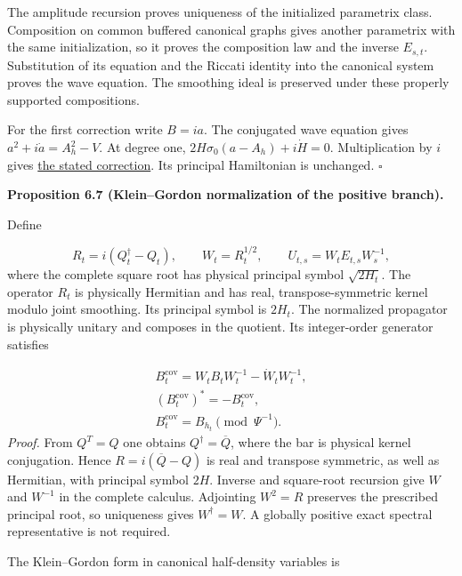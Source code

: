 \documentclass[
  english,
  11pt,
  reqno]{amsart}
\makeatletter
\newcommand{\pandocstatementheading}[1]{%
  \par\addpenalty{\@beginparpenalty}%
  \addvspace{.5\baselineskip plus .2\baselineskip minus .2\baselineskip}%
  {\normalfont\bfseries #1\par}%
  \nobreak\@afterindenttrue\@afterheading
}
\makeatother
\begin{document}
The amplitude recursion proves uniqueness of the initialized parametrix
class. Composition on common buffered canonical graphs gives another
parametrix with the same initialization, so it proves the composition
law and the inverse \(E_{s,t}\). Substitution of its equation and the
Riccati identity into the canonical system proves the wave equation. The
smoothing ideal is preserved under these properly supported
compositions.

For the first correction write \(B=ia\). The conjugated wave equation
gives \(a^2+i\dot a=A_h^2-V\). At degree one,
\(2H\sigma_0(a-A_h)+i\dot H=0\). Multiplication by \(i\) gives
\hyperref[eq:online-wave-corrected-generator]{the stated correction}.
Its principal Hamiltonian is unchanged. \hfill\(\square\)

\pandocstatementheading{\leavevmode{}\label{prop:online-wave-charge-normalization}Proposition 6.7 (Klein--Gordon normalization of the positive branch).}

Define

\label{eq:online-wave-charge-normalization} \[
R_t=i(Q_t^\dagger-Q_t),\qquad
W_t=R_t^{1/2},\qquad
U_{t,s}=W_tE_{t,s}W_s^{-1},
\] where the complete square root has physical principal symbol
\(\sqrt{2H_t}\). The operator \(R_t\) is physically Hermitian and has
real, transpose-symmetric kernel modulo joint smoothing. Its principal
symbol is \(2H_t\). The normalized propagator is physically unitary and
composes in the quotient. Its integer-order generator satisfies

\label{eq:online-wave-normalized-generator} \[
\begin{gathered}
B_t^{\mathrm{cov}}
=W_tB_tW_t^{-1}-\dot W_tW_t^{-1}, \\
(B_t^{\mathrm{cov}})^*=-B_t^{\mathrm{cov}}, \\
B_t^{\mathrm{cov}}=B_{h_t}\pmod{\Psi^{-1}}.
\end{gathered}
\] \emph{Proof.} From \(Q^T=Q\) one obtains \(Q^\dagger=\overline Q\),
where the bar is physical kernel conjugation. Hence
\(R=i(\overline Q-Q)\) is real and transpose symmetric, as well as
Hermitian, with principal symbol \(2H\). Inverse and square-root
recursion give \(W\) and \(W^{-1}\) in the complete calculus. Adjointing
\(W^2=R\) preserves the prescribed principal root, so uniqueness gives
\(W^\dagger=W\). A globally positive exact spectral representative is
not required.

The Klein--Gordon form in canonical half-density variables is
\end{document}
